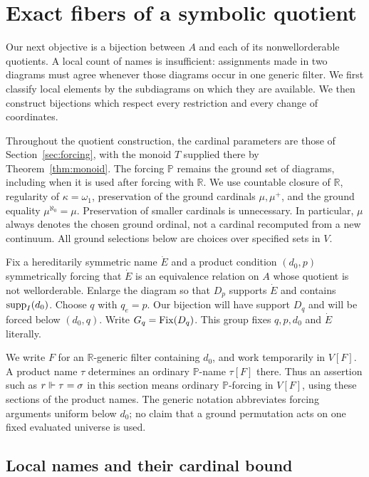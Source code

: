 \section{Exact fibers of a symbolic quotient}\label{sec:quotient-fibers}\label{sec:quotients}

Our next objective is a bijection between $A$ and each of its
nonwellorderable quotients. A local count of names is insufficient:
assignments made in two diagrams must agree whenever those diagrams
occur in one generic filter. We first classify local elements by the
subdiagrams on which they are available. We then construct bijections
which respect every restriction and every change of coordinates.

Throughout the quotient construction, the cardinal parameters are those
of Section~\ref{sec:forcing}, with the monoid $T$ supplied there by
Theorem~\ref{thm:monoid}. The forcing $\mathbb P$ remains the
ground set of diagrams, including when it is used after forcing with
$\mathbb R$. We use countable closure of $\mathbb R$, regularity of
$\kappa=\omega_1$, preservation of the ground cardinals $\mu,\mu^+$,
and the ground equality $\mu^{\aleph_0}=\mu$. Preservation of smaller
cardinals is unnecessary. In particular, $\mu$ always denotes the
chosen ground ordinal, not a cardinal recomputed from a new continuum.
All ground selections below are choices over specified sets in $V$.

Fix a hereditarily symmetric name $\dot E$ and a product condition
$(d_0,p)$ symmetrically forcing that $\dot E$ is an equivalence relation
on $A$ whose quotient is not wellorderable. Enlarge the diagram so that
$D_p$ supports $\dot E$ and contains $\operatorname{supp}_I(d_0)$. Choose $q$ with
$q_e=p$. Our bijection will have support $D_q$ and will be forced below
$(d_0,q)$. Write $G_q=\operatorname{Fix}(D_q)$. This group fixes $q,p,d_0$ and
$\dot E$ literally.

We write $F$ for an $\mathbb R$-generic filter containing $d_0$, and
work temporarily in $V[F]$. A product name $\tau$ determines an ordinary
$\mathbb P$-name $\tau[F]$ there. Thus an assertion such as
$r\Vdash\tau=\sigma$ in this section means ordinary $\mathbb P$-forcing
in $V[F]$, using these sections of the product names. The generic
notation abbreviates forcing arguments uniform below $d_0$; no claim
that a ground permutation acts on one fixed evaluated universe is used.

\subsection{Local names and their cardinal bound}

